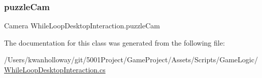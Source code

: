 \mbox{\label{class_while_loop_desktop_interaction_aa8ae2d0ac0055053eb63436135108f7d}} 
\subsubsection{\texorpdfstring{puzzle\+Cam}{puzzleCam}}
{\footnotesize\ttfamily Camera While\+Loop\+Desktop\+Interaction.\+puzzle\+Cam}



The documentation for this class was generated from the following file\+:\begin{DoxyCompactItemize}
\item 
/\+Users/kwanholloway/git/5001\+Project/\+Game\+Project/\+Assets/\+Scripts/\+Game\+Logic/\hyperlink{_while_loop_desktop_interaction_8cs}{While\+Loop\+Desktop\+Interaction.\+cs}\end{DoxyCompactItemize}
